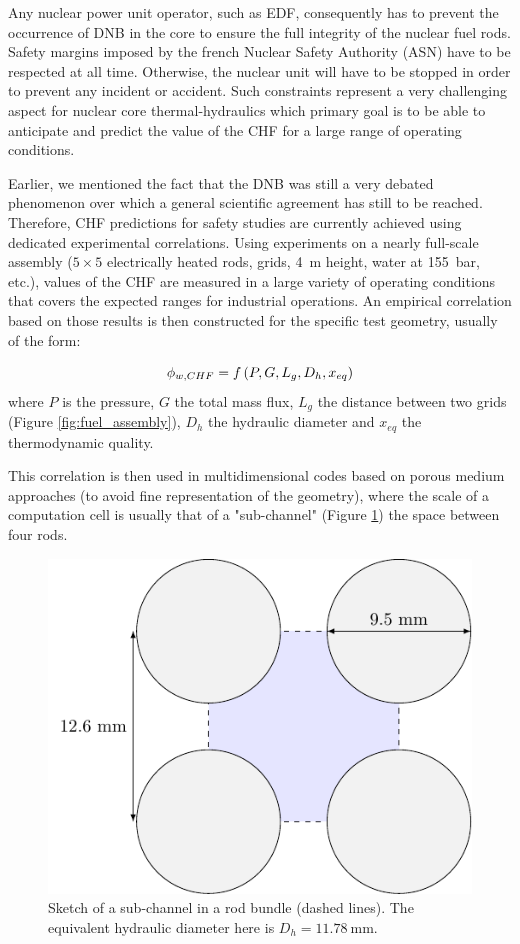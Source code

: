 \npar

Any nuclear power unit operator, such as EDF, consequently has to prevent the occurrence of DNB in the core to ensure the full integrity of the nuclear fuel rods. Safety margins imposed by the french Nuclear Safety Authority (ASN) have to be respected at all time. Otherwise, the nuclear unit will have to be stopped in order to prevent any incident or accident. Such constraints represent a very challenging aspect for nuclear core thermal-hydraulics which primary goal is to be able to anticipate and predict the value of the CHF for a large range of operating conditions.

\npar

Earlier, we mentioned the fact that the DNB was still a very debated phenomenon over which a general scientific agreement has still to be reached. Therefore, CHF predictions for safety studies are currently achieved using dedicated experimental correlations. Using experiments on a nearly full-scale assembly ($5 \times 5$ electrically heated rods, grids, 4\ m height, water at 155\ bar, etc.), values of the CHF are measured in a large variety of operating conditions that covers the expected ranges for industrial operations. An empirical correlation based on those results is then constructed for the specific test geometry, usually of the form:

\begin{equation}
\phi_{w,CHF} = f\left( P, G, L_{g}, D_{h}, x_{eq} \right)
\end{equation}
where $P$ is the pressure, $G$ the total mass flux, $L_{g}$ the distance between two grids (Figure \ref{fig:fuel_assembly}), $D_{h}$ the hydraulic diameter and $x_{eq}$ the thermodynamic quality.


\npar

This correlation is then used in multidimensional codes based on porous medium approaches (to avoid fine representation of the geometry), where the scale of a computation cell is usually that of a "sub-channel" (Figure \ref{fig:subchannel_sketch}) \ie the space between four rods.


\begin{figure}[!h]
\centering
\includegraphics[width=0.4\linewidth]{img/intro/subchannel.pdf}
\caption{Sketch of a sub-channel in a rod bundle (dashed lines). The equivalent hydraulic diameter here is $D_{h}=11.78\ $mm.}
\label{fig:subchannel_sketch}
\end{figure}

